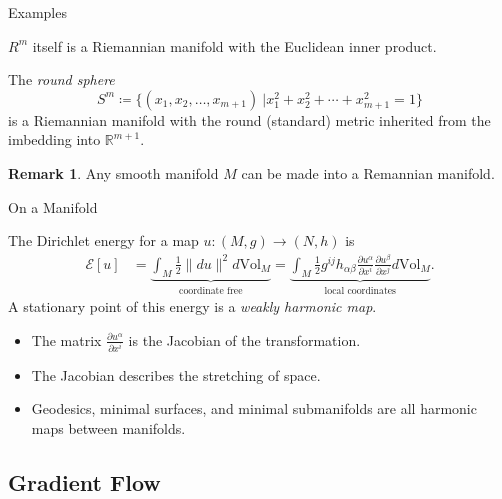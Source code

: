 \documentclass[usenames,dvipsnames]{beamer}
\theoremstyle{definition}
\newtheorem*{remark}{Remark}
\theoremstyle{theorem}
\newcommand{\R}{\mathbb{R}}
\begin{document}
        \begin{frame}{Examples}
            \begin{example}
            $R^m$ itself is a Riemannian manifold with the Euclidean inner product.
            \end{example}
            \pause
            \begin{example}
            The \emph{round sphere} 
            \[
            S^m \coloneqq \{ (x_1,x_2,\dots,x_{m+1}) ~\vert x_1^2+x_2^2+\cdots+ x_{m+1}^2 = 1\}
            \]
            is a Riemannian manifold with the round (standard) metric inherited from the imbedding into $\R^{m+1}$.
            \end{example}
            \pause
            \begin{remark}
            Any smooth manifold $M$ can be made into a Remannian manifold.
            \end{remark}
        \end{frame}
        
        \begin{frame}{On a Manifold}
            \begin{definition}
            The Dirichlet energy for a map $u \colon (M,g) \to (N,h)$ is
            \begin{align*}
            \mathcal{E}[u] &= \underbrace{\int_{M} \frac{1}{2} \|du\|^2 d\textrm{Vol}_M}_{\textrm{coordinate free}} =  \underbrace{\int_{M} \frac{1}{2} g^{ij}h_{\alpha \beta} \frac{\partial u^\alpha}{\partial x^i}\frac{\partial u^\beta}{\partial x^j}d\textrm{Vol}_M}_{\textrm{local coordinates}}.
            \end{align*}
            A stationary point of this energy is a \emph{weakly harmonic map}.
            \end{definition}
            \begin{itemize}
                \item The matrix $\frac{\partial u^\alpha}{\partial x^i}$ is the Jacobian of the transformation.
                \item The Jacobian describes the stretching of space.
                \item Geodesics, minimal surfaces, and minimal submanifolds are all harmonic maps between manifolds.
            \end{itemize}
        \end{frame}
        
    \subsection{Gradient Flow}
    
\end{document}
